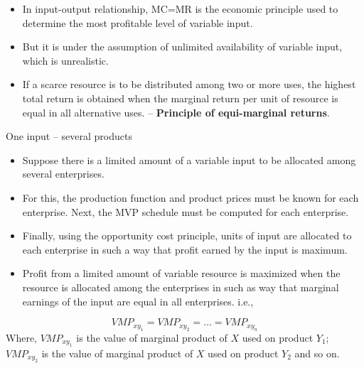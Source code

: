 \documentclass[12pt,ignorenonframetext,aspectratio=169]{beamer}
\providecommand{\tightlist}{%
  \setlength{\itemsep}{0pt}\setlength{\parskip}{0pt}}
\begin{document}
\begin{frame}{}
\protect\hypertarget{section-8}{}
\begin{itemize}
\tightlist
\item
  In input-output relationship, MC=MR is the economic principle used to
  determine the most profitable level of variable input.
\item
  But it is under the assumption of unlimited availability of variable
  input, which is unrealistic.
\item
  If a scarce resource is to be distributed among two or more uses, the
  highest total return is obtained when the marginal return per unit of
  resource is equal in all alternative uses. -- \textbf{Principle of
  equi-marginal returns}.
\end{itemize}
\end{frame}

\begin{frame}{One input -- several products}
\protect\hypertarget{one-input-several-products}{}
\footnotesize

\begin{itemize}
\tightlist
\item
  Suppose there is a limited amount of a variable input to be allocated
  among several enterprises.
\item
  For this, the production function and product prices must be known for
  each enterprise. Next, the MVP schedule must be computed for each
  enterprise.
\item
  Finally, using the opportunity cost principle, units of input are
  allocated to each enterprise in such a way that profit earned by the
  input is maximum.
\item
  Profit from a limited amount of variable resource is maximized when
  the resource is allocated among the enterprises in such as way that
  marginal earnings of the input are equal in all enterprises. i.e.,
\end{itemize}

\[
VMP_{xy_{1}} = VMP_{xy_{2}} = \ldots = VMP_{xy_{n}}
\] Where, \(VMP_{xy_{1}}\) is the value of marginal product of \(X\)
used on product \(Y_1\); \(VMP_{xy_{2}}\) is the value of marginal
product of \(X\) used on product \(Y_2\) and so on.
\end{frame}
\end{document}
